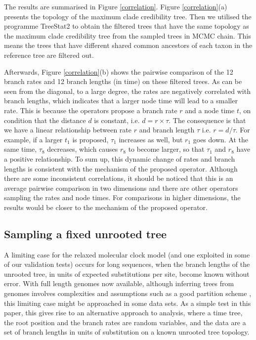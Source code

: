 \documentclass{bmcart}
\begin{document}
The results are summarised in Figure \ref{correlation}. Figure \ref{correlation}(a) presents the topology of the maximum clade credibility tree. Then we utilised the programme TreeStat2 \cite{TreeStat2} to obtain the filtered trees that have the same topology as the maximum clade credibility tree from the sampled trees in MCMC chain. This means the trees that have different shared common ancestors of each taxon in the reference tree are filtered out. 

Afterwards, Figure \ref{correlation}(b) shows the pairwise comparison of the 12 branch rates and 12 branch lengths (in time) on these filtered trees. As can be seen from the diagonal, to a large degree, the rates are negatively correlated with branch lengths, which indicates that a larger node time will lead to a smaller rate. This is because the operators propose a branch rate $r$ and a node time $t$, on condition that the distance $d$ is constant, i.e. $d = r \times \tau$.  The consequence is that we have a linear relationship between rate $r$ and branch length $\tau$ i.e. $r = d/\tau $.  For example, if a larger $t_1$ is proposed, ${\tau _1}$ increases as well, but $r_1$ goes down. At the same time, ${\tau _8}$ decreases, which causes $r_8$ to become larger, so that ${\tau _1}$ and $r_8$ have a positive relationship. To sum up, this dynamic change of rates and branch lengths is consistent with the mechanism of the proposed operator. Although there are some inconsistent correlations, it should be noticed that this is an average pairwise comparison in two dimensions and there are other operators sampling the rates and node times. For comparisons in higher dimensions, the results would be closer to the mechanism of the proposed operator.

\subsection*{Sampling a fixed unrooted tree}
A limiting case for the relaxed molecular clock model (and one exploited in some of our validation tests) occurs for long sequences, when the branch lengths of the unrooted tree, in units of expected substitutions per site, become known without error. With full length genomes now available, although inferring trees from genomes involves complexities and assumptions such as a good partition scheme \cite{lanfear2012partitionfinder}, this limiting case might be approached in some data sets. As a simple test in this paper, this gives rise to an alternative approach to analysis, where a time tree, the root position and the branch rates are random variables, and the data are a set of branch lengths in units of substitution on a known unrooted tree topology. 
\end{document}
